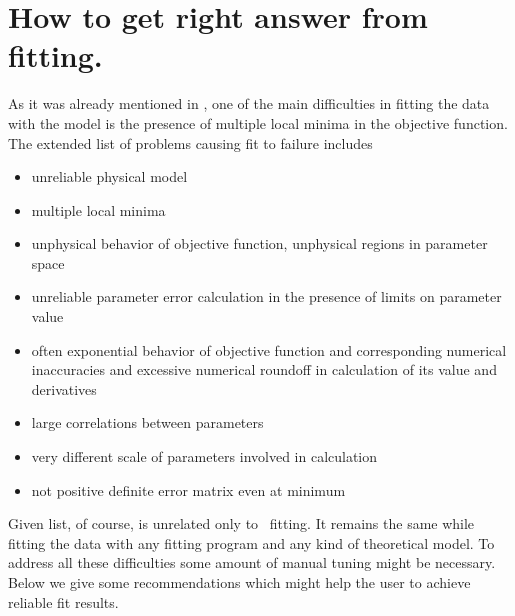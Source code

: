 \section {How to get right answer from fitting.} 

As it was already mentioned in , 
one of the main difficulties in fitting the data with the model 
is the presence of multiple
local minima in the objective function. The extended list of problems causing fit to failure includes
\begin{itemize}
\item unreliable physical model
\item multiple local minima
\item unphysical behavior of objective function, unphysical regions in parameter space
\item unreliable parameter error calculation in the presence of limits on parameter value
\item often exponential behavior of objective function and corresponding numerical inaccuracies and excessive numerical roundoff in calculation of its value and derivatives
\item large correlations between parameters
\item very different scale of parameters involved in calculation
\item not positive definite error matrix even at minimum
\end{itemize}


Given list, of course, is unrelated only to \BornAgain\ fitting. It remains the same
while fitting the data with any fitting program and any kind of theoretical model.
To address all these difficulties some amount of manual tuning might be necessary. Below we give some recommendations which might help the user to achieve reliable fit results.

